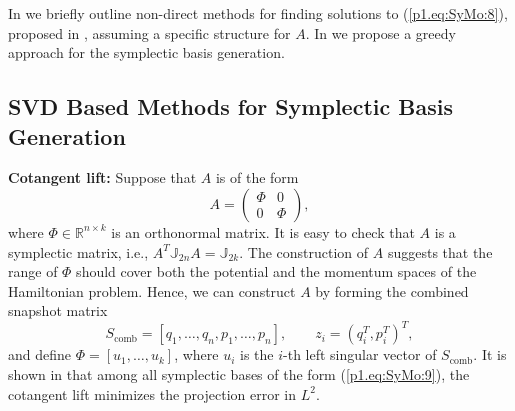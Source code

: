 In  we briefly outline non-direct methods for finding solutions to (\ref{p1.eq:SyMo:8}), proposed in \cite{doi:10.1137/140978922}, assuming a specific structure for $A$. In  we propose a greedy approach for the symplectic basis generation.

\subsection{SVD Based Methods for Symplectic Basis Generation} \label{p1.chap:SyMo.PrSy:2} 
{\bf Cotangent lift:} Suppose that $A$ is of the form
\begin{equation} \label{p1.eq:SyMo:9}
	A = 
	\begin{pmatrix}
		\Phi & 0 \\
		0 & \Phi
	\end{pmatrix},
\end{equation}
where $\Phi \in \mathbb{R}^{n\times k}$ is an orthonormal matrix. It is easy to check that $A$ is a symplectic matrix, i.e., $A^T \mathbb J_{2n} A = \mathbb J_{2k}$. The construction of $A$ suggests that the range of $\Phi$ should cover both the potential and the momentum spaces of the Hamiltonian problem. Hence, we can construct $A$ by forming the combined snapshot matrix
\begin{equation} \label{p1.eq:SyMo:10}
	S_{\text{comb}} = [q_1,\dots,q_n,p_1,\dots,p_n], \qquad z_i = (q_i^T,p_i^T)^T,
\end{equation}
and define $\Phi=[u_1,\dots,u_k]$, where $u_i$ is the $i$-th left singular vector of $S_{\text{comb}}$. It is shown in \cite{doi:10.1137/140978922} that among all symplectic bases of the form (\ref{p1.eq:SyMo:9}), the cotangent lift minimizes the projection error in $L^2$.


